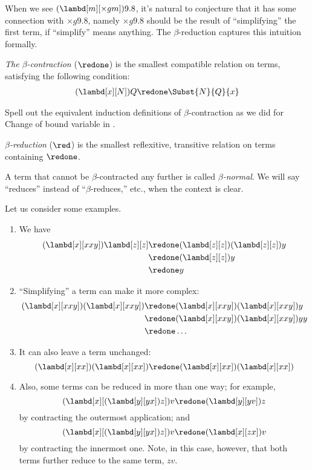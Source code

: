 \documentclass[../../../include/open-logic-section]{subfiles}
\begin{document}

When we see $(\lambd[m][\times g m]) 9.8$, it's natural to
conjecture that it has some connection with $\times g 9.8$,
namely  $\times g 9.8$ should be the result of ``simplifying'' the first term, if
``simplify'' means anything. The $\beta$-reduction captures this
intuition formally.

\begin{defn} 
  \emph{The $\beta$-contraction} ($\redone$) is the smallest compatible
  relation on terms, satisfying the following condition:
  \begin{align*}
    (\lambd[x][N])Q \redone \Subst{N}{Q}{x}
  \end{align*}
\end{defn}

\begin{prob}
  Spell out the equivalent induction definitions of $\beta$-contraction as we
  did for Change of bound variable in .
\end{prob}
  
\begin{defn} 
  \emph{$\beta$-reduction} ($\red$) is the smallest reflexitive, transitive
  relation on terms containing $\redone$.
\end{defn}

\begin{defn}
A term that cannot be $\beta$-contracted any further is called 
\emph{$\beta$-normal}. We will say ``reduces'' instead of ``$\beta$-reduces,''
etc., when the context is clear.
\end{defn}

Let us consider some examples.
\begin{enumerate}
\item We have
\begin{align*}
(\lambd[x][xxy]) \lambd[z][z] & \redone (\lambd[z][z])(\lambd[z][z]) y \\
& \redone (\lambd[z][z]) y \\
& \redone y
\end{align*}
\item ``Simplifying'' a term can make it more complex:
\begin{align*}
(\lambd[x][xxy])(\lambd[x][xxy]) & \redone (\lambd[x][xxy])(\lambd[x][xxy])y \\
& \redone (\lambd[x][xxy])(\lambd[x][xxy])yy \\
& \redone \dots
\end{align*}
\item It can also leave a term unchanged:
\[
(\lambd[x][xx])(\lambd[x][xx]) \redone (\lambd[x][xx])(\lambd[x][xx])
\]
\item Also, some terms can be reduced in more than one way; for
  example,
\[
(\lambd[x][(\lambd[y][yx]) z]) v \redone (\lambd[y][yv]) z
\]
by contracting the outermost application; and
\[
(\lambd[x][(\lambd[y][yx]) z]) v \redone (\lambd[x][zx]) v
\]
by contracting the innermost one. Note, in this case, however, that
both terms further reduce to the same term, $zv$.
\end{enumerate}
\end{document}
